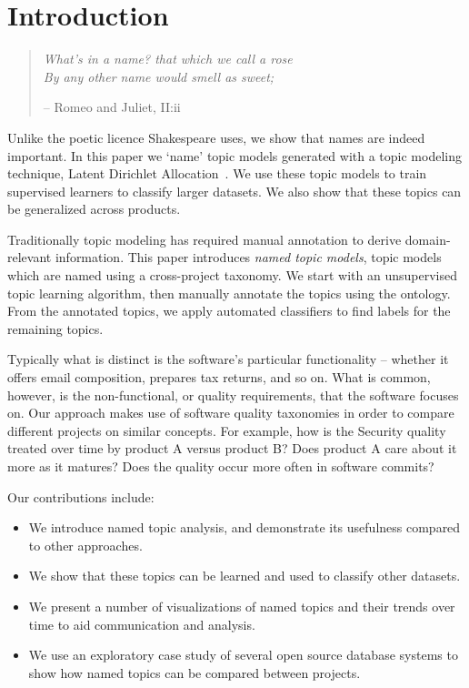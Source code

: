 \documentclass[10pt, conference, compsocconf]{IEEEtran}
\begin{document}
\section{Introduction}
\begin{quote}
	\emph{What's in a name? that which we call a rose\\
	By any other name would smell as sweet;}
	\begin{flushright} -- Romeo and Juliet, II:ii\end{flushright}
\end{quote}

Unlike the poetic licence Shakespeare uses, we show that names are indeed important. In this paper we `name' topic models generated with a topic modeling technique, Latent Dirichlet Allocation~\cite{Blei2003}. We use these topic models to train supervised learners to classify larger datasets. We also show that these topics can be generalized across products.

Traditionally topic modeling has required manual annotation to derive domain-relevant information. This paper introduces \emph{named topic models}, topic models which are named using a cross-project taxonomy. We start with an unsupervised topic learning algorithm, then manually annotate the topics using the ontology. From the annotated topics, we apply automated classifiers to find labels for the remaining topics. 

Typically what is distinct is the software's particular functionality -- whether it offers email composition, prepares tax returns, and so on. What is common, however, is the non-functional, or quality requirements, that the software focuses on. Our approach makes use of software quality taxonomies in order to compare different projects on similar concepts. For example, how is the Security quality treated over time by product A versus product B? Does product A care about it more as it matures? Does the quality occur more often in software commits?

Our contributions include:
\begin{itemize}
\item  We introduce named topic analysis, and demonstrate its usefulness
  compared to other approaches.
\item We show that these topics can be learned and used to classify other datasets.
\item We present a number of visualizations of named topics and their trends over time to aid
  communication and analysis.
\item We use an exploratory case study of
  several open source database systems to show how named topics can be compared between projects.
\end{itemize}
\end{document}
